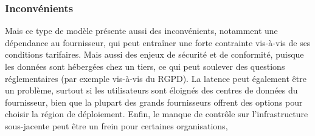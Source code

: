 \documentclass{report} %
\begin{document}

\subsubsection{Inconvénients}

Mais ce type de modèle présente aussi des inconvénients, notamment une dépendance au fournisseur, 
qui peut entraîner une forte contrainte vis-à-vis de ses conditions tarifaires. 
Mais aussi des enjeux de sécurité et de conformité, puisque les données sont hébergées chez un tiers, 
ce qui peut soulever des questions réglementaires (par exemple vis-à-vis du RGPD).
La latence peut également être un problème, surtout si les utilisateurs sont éloignés des centres de données du fournisseur, 
bien que la plupart des grands fournisseurs offrent des options pour choisir la région de déploiement.
Enfin, le manque de contrôle sur l’infrastructure sous-jacente peut être un frein pour certaines organisations,
      
\end{document}
